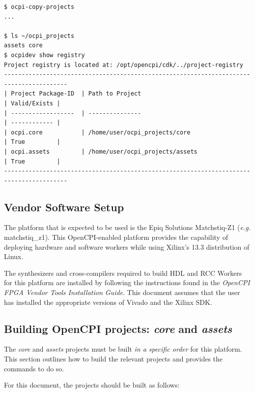 \begin{flushleft}
\begin{verbatim}
$ ocpi-copy-projects
...

$ ls ~/ocpi_projects
assets core
$ ocpidev show registry
Project registry is located at: /opt/opencpi/cdk/../project-registry
----------------------------------------------------------------------------------------
| Project Package-ID  | Path to Project                                 | Valid/Exists |
| ------------------  | ---------------                                 | ------------ |
| ocpi.core           | /home/user/ocpi_projects/core                   | True         |
| ocpi.assets         | /home/user/ocpi_projects/assets                 | True         |
----------------------------------------------------------------------------------------
\end{verbatim}

\subsection{Vendor Software Setup}
The platform that is expected to be used is the Epiq Solutions Matchstiq-Z1 (\textit{e.g.} matchstiq\_z1). This OpenCPI-enabled platform provides the capability of deploying hardware and software workers while using Xilinx's 13.3 distribution of Linux.\\ \bigskip

The synthesizers and cross-compilers required to build HDL and RCC Workers for this platform are installed by following the instructions found in the \textit{OpenCPI FPGA Vendor Tools Installation Guide}. This document assumes that the user has installed the appropriate versions of Vivado and the Xilinx SDK.\\ \bigskip

\subsection{Building OpenCPI projects: \textit{core} and \textit{assets} }
\label{sec:Building OpenCPI projects}
The \textit{core} and \textit{assets} projects must be built \textit{in a specific order} for this platform. This section outlines how to build the relevant projects and provides the commands to do so.\medskip

For this document, the projects should be built as follows:\\


\end{flushleft}
